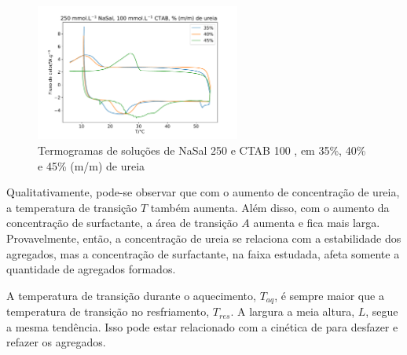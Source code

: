	\begin{figure}[H]
		\centering
		\includegraphics[width=0.60\textwidth]{./imagens/dsc/NaSal250}
		\caption{Termogramas de soluções de NaSal 250\mM{} e CTAB 100 \mM{}, em 35\%, 40\% e 45\% (m/m) de ureia}
		\label{fig:DSC_NaSal250}
	\end{figure}
%	
%	
%

		
	
	Qualitativamente, pode-se observar que com o aumento de concentração de ureia, a temperatura de transição $T$ também aumenta. Além disso, com o aumento da concentração de surfactante, a área de transição $A$ aumenta e fica mais larga. Provavelmente, então, a concentração de ureia se relaciona com a estabilidade dos agregados, mas a concentração de surfactante, na faixa estudada, afeta somente a quantidade de agregados formados. 
	
	A temperatura de transição durante o aquecimento, $T_{aq}$, é sempre maior que a temperatura de transição no resfriamento, $T_{res}$. A largura a meia altura, $L$, segue a mesma tendência. Isso pode estar relacionado com a cinética de para desfazer e refazer os agregados. 
	
